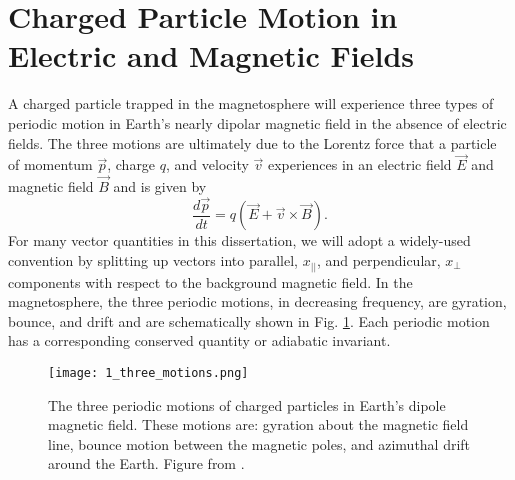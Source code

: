 \section{Charged Particle Motion in Electric and Magnetic Fields}\label{Intro:particle_motion}
A charged particle trapped in the magnetosphere will experience three types of periodic motion in Earth's nearly dipolar magnetic field in the absence of electric fields. The three motions are ultimately due to the Lorentz force that a particle of momentum $\vec{p}$, charge $q$, and velocity $\vec{v}$ experiences in an electric field $\vec{E}$ and magnetic field $\vec{B}$ and is given by
\begin{equation} \label{Intro:Lorentz}
\frac{d\vec{p}}{dt} = q(\vec{E} + \vec{v} \times \vec{B}).
\end{equation} For many vector quantities in this dissertation, we will adopt a widely-used convention by splitting up vectors into parallel, $x_{||}$, and perpendicular, $x_\perp$ components with respect to the background magnetic field. In the magnetosphere, the three periodic motions, in decreasing frequency, are gyration, bounce, and drift and are schematically shown in Fig. \ref{Intro:motion_diagram}. Each periodic motion has a corresponding conserved quantity or adiabatic invariant. 

\begin{figure}
\texttt{[image: 1\_three\_motions.png]}
\caption{The three periodic motions of charged particles in Earth's dipole magnetic field. These motions are: gyration about the magnetic field line, bounce motion between the magnetic poles, and azimuthal drift around the Earth. Figure from \citep{Baumjohann1997}.}
\label{Intro:motion_diagram}
\end{figure}


